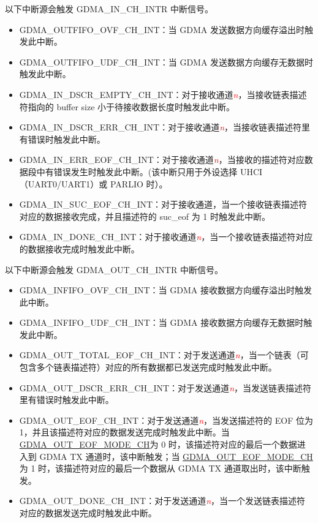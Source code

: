 \documentclass[main\_\_CN.tex]{subfiles}
\begin{document}
以下中断源会触发 GDMA\_IN\_CH\_INTR 中断信号。
\begin{itemize}
\item \label{int:GDMAOUTFIFOOVFINT} GDMA\_OUTFIFO\_OVF\_CH\_INT：当 GDMA 发送数据方向缓存溢出时触发此中断。
\item \label{int:GDMAOUTFIFOUDFINT}GDMA\_OUTFIFO\_UDF\_CH\_INT：当 GDMA 发送数据方向缓存无数据时触发此中断。
\item \label{int:GDMAINDSCREMPTYINT}GDMA\_IN\_DSCR\_EMPTY\_CH\_INT：对于接收通道\textcolor{red}{\it{n}}，当接收链表描述符指向的 buffer size 小于待接收数据长度时触发此中断。
\item \label{int:GDMAINDSCRERRINT}GDMA\_IN\_DSCR\_ERR\_CH\_INT：对于接收通道\textcolor{red}{\it{n}}，当接收链表描述符里有错误时触发此中断。
\item \label{int:GDMAINERREOFINT}GDMA\_IN\_ERR\_EOF\_CH\_INT：对于接收通道\textcolor{red}{\it{n}}，当接收的描述符对应数据段中有错误发生时触发此中断。(该中断只用于外设选择 UHCI（UART0/UART1）或 PARLIO 时）。
\item \label{int:GDMAINSUCEOFINT}GDMA\_IN\_SUC\_EOF\_CH\_INT：对于接收通道，当一个接收链表描述符对应的数据接收完成，并且描述符的 suc\_eof 为 1 时触发此中断。
\item \label{int:GDMAINDONEINT}GDMA\_IN\_DONE\_CH\_INT：对于接收通道\textcolor{red}{\it{n}}，当一个接收链表描述符对应的数据接收完成时触发此中断。
\end{itemize}

以下中断源会触发 GDMA\_OUT\_CH\_INTR 中断信号。
\begin{itemize}
\item \label{int:GDMAINFIFOOVFINT} GDMA\_INFIFO\_OVF\_CH\_INT：当 GDMA 接收数据方向缓存溢出时触发此中断。
\item \label{int:GDMAINFIFOUDFINT}GDMA\_INFIFO\_UDF\_CH\_INT：当 GDMA 接收数据方向缓存无数据时触发此中断。
\item \label{int:GDMAOUTTOTALEOFINT}GDMA\_OUT\_TOTAL\_EOF\_CH\_INT：对于发送通道\textcolor{red}{\it{n}}，当一个链表（可包含多个链表描述符）对应的所有数据都已发送完成时触发此中断。
\item \label{int:GDMAOUTDSCRERRINT}GDMA\_OUT\_DSCR\_ERR\_CH\_INT：对于发送通道\textcolor{red}{\it{n}}，当发送链表描述符里有错误时触发此中断。
\item \label{int:GDMAOUTEOFINT}GDMA\_OUT\_EOF\_CH\_INT：对于发送通道\textcolor{red}{\it{n}}，当发送描述符的 EOF 位为 1，并且该描述符对应的数据发送完成时触发此中断。当 \hyperref[fielddesc:GDMAOUTEOFMODECHN]{GDMA\_OUT\_EOF\_MODE\_CH}为 0 时，该描述符对应的最后一个数据进入到 GDMA TX 通道时，该中断触发；当 \hyperref[fielddesc:GDMAOUTEOFMODECHN]{GDMA\_OUT\_EOF\_MODE\_CH}为 1 时，该描述符对应的最后一个数据从 GDMA TX 通道取出时，该中断触发。
\item \label{int:GDMAOUTDONEINT}GDMA\_OUT\_DONE\_CH\_INT：对于发送通道\textcolor{red}{\it{n}}，当一个发送链表描述符对应的数据发送完成时触发此中断。
\end{itemize}
\end{document}

